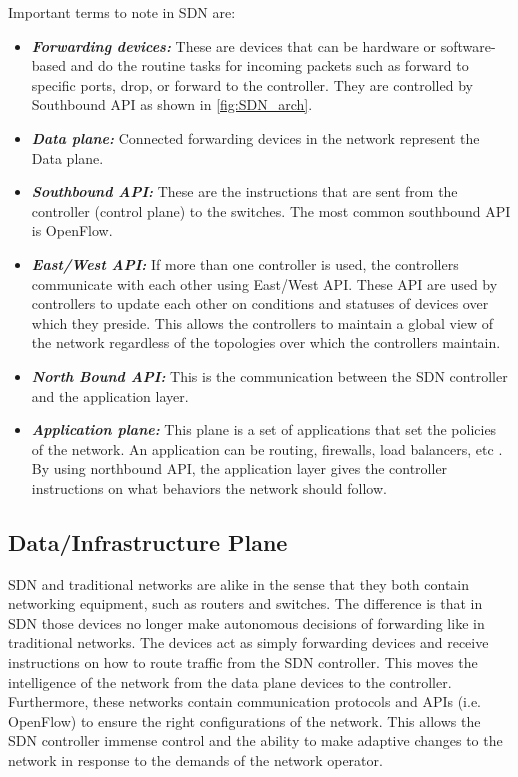 \documentclass[conference]{IEEEtran}
\begin{document}
Important terms to note in SDN are:
\begin{itemize}
    \item \textbf{\emph{Forwarding devices:}} These are devices that can be hardware or software-based and do the routine tasks for incoming packets such as forward to specific ports, drop, or forward to the controller. They are controlled by Southbound API as shown in \cref{fig:SDN_arch}.
    
    \item \textbf{\emph{Data plane:}} Connected forwarding devices in the network represent the Data plane.
    

    
  \item\textbf{\emph{Southbound API:}} These are the instructions that are sent from the controller (control plane)  to the switches. The most common southbound API is OpenFlow.
  
  \item\textbf{\emph{East/West API:}} If more than one controller is used, the controllers communicate with each other using East/West API. These API are used by controllers to update each other on conditions and statuses of devices over which they preside. This allows the controllers to maintain a global view of the network regardless of the topologies over which the controllers maintain.  
  
  \item \textbf{\emph{North Bound API:}} This is the communication between the SDN controller and the application layer. 
    
  \item \textbf{\emph{Application plane:}} This plane is a set of applications that set the policies of the network. An application can be routing, firewalls, load balancers, etc \cite{al2020comprehensive}. By using northbound API, the application layer gives the controller instructions on what behaviors the network should follow.
\end{itemize}


\subsection{Data/Infrastructure Plane}
SDN and traditional networks are alike in the sense that they both contain networking equipment, such as routers and switches. The difference is that in SDN those devices no longer make autonomous decisions of forwarding like in traditional networks. The devices act as simply forwarding devices and receive instructions on how to route traffic from the SDN controller. This moves the intelligence of the network from the data plane devices to the controller. Furthermore, these networks contain communication protocols and APIs (i.e. OpenFlow) to ensure the right configurations of the network. This allows the SDN controller immense control and the ability to make adaptive changes to the network in response to the demands of the network operator. 
\end{document}
